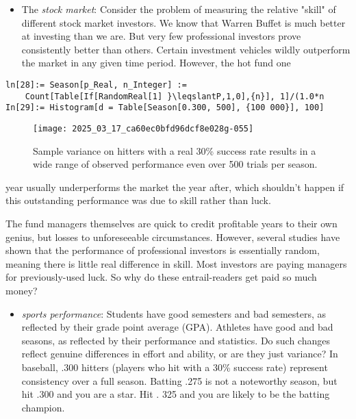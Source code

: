 \documentclass[10pt]{article}
\begin{document}
\begin{itemize}
  \item The \textit{stock market}: Consider the problem of measuring the relative "skill" of different stock market investors. We know that Warren Buffet is much better at investing than we are. But very few professional investors prove consistently better than others. Certain investment vehicles wildly outperform the market in any given time period. However, the hot fund one
\end{itemize}

\begin{verbatim}
ln[28]:= Season[p_Real, n_Integer] :=
    Count[Table[If[RandomReal[1] }\leqslantP,1,0],{n}], 1]/(1.0*n
In[29]:= Histogram[d = Table[Season[0.300, 500], {100 000}], 100]
\end{verbatim}

\begin{figure}[h]
  \centering
  \texttt{[image: 2025\_03\_17\_ca60ec0bfd96dcf8e028g-055]}
  \caption{Sample variance on hitters with a real 30\% success rate results in a wide range of observed performance even over 500 trials per season.}
\end{figure}

year usually underperforms the market the year after, which shouldn't happen if this outstanding performance was due to skill rather than luck.

The fund managers themselves are quick to credit profitable years to their own genius, but losses to unforeseeable circumstances. However, several studies have shown that the performance of professional investors is essentially random, meaning there is little real difference in skill. Most investors are paying managers for previously-used luck. So why do these entrail-readers get paid so much money?

\begin{itemize}
  \item \textit{sports performance}: Students have good semesters and bad semesters, as reflected by their grade point average (GPA). Athletes have good and bad seasons, as reflected by their performance and statistics. Do such changes reflect genuine differences in effort and ability, or are they just variance?
In baseball, .300 hitters (players who hit with a 30\% success rate) represent consistency over a full season. Batting .275 is not a noteworthy season, but hit .300 and you are a star. Hit . 325 and you are likely to be the batting champion.
\end{itemize}
\end{document}
